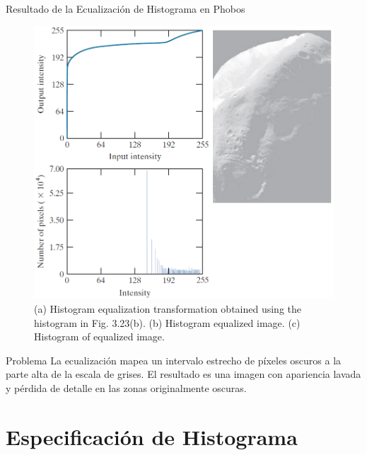 \documentclass{beamer}
\begin{document}
\begin{frame}{Resultado de la Ecualización de Histograma en Phobos}
    \begin{figure}
            \includegraphics[width=0.4\linewidth]{figuras/Fig_3_24.png}
            \caption{\footnotesize{(a) Histogram equalization transformation obtained using the histogram in Fig. 3.23(b). (b) Histogram equalized image. (c) Histogram of equalized image.}}
    \end{figure}
    \begin{alertblock}{\footnotesize Problema}\footnotesize
        La ecualización mapea un intervalo estrecho de píxeles oscuros a la parte alta de la escala de grises. El resultado es una imagen con apariencia lavada y pérdida de detalle en las zonas originalmente oscuras.
    \end{alertblock}
\end{frame}

\section{Especificación de Histograma}
\end{document}
